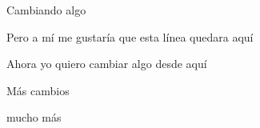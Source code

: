 \documentclass{article}
\begin{document}
Cambiando algo


Pero a mí me gustaría que esta línea quedara aquí

Ahora yo quiero cambiar algo desde aquí

Más cambios

mucho más
\end{document}
